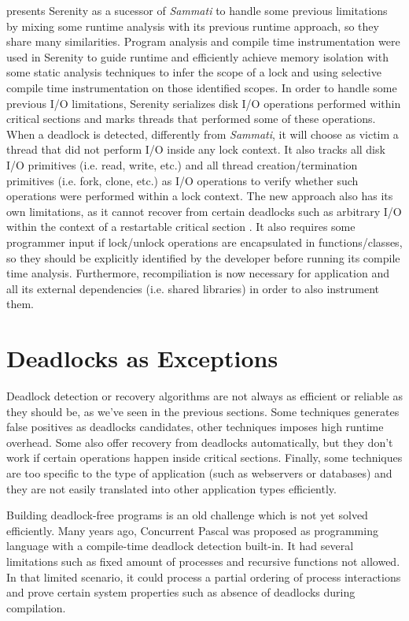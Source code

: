 \citet{serenity} presents Serenity as a sucessor of \emph{Sammati} \citep{sammati} to handle some previous limitations by mixing some runtime analysis with
its previous runtime approach, so they share many similarities.
Program analysis and compile time instrumentation were used in Serenity to guide runtime and efficiently achieve memory isolation with
some static analysis techniques to infer the scope of a lock and using selective compile time instrumentation on those identified scopes.
In order to handle some previous I/O limitations, Serenity serializes disk I/O operations performed within critical sections and marks
threads that performed some of these operations.
When a deadlock is detected, differently from \emph{Sammati}, it will choose as victim a thread that did not perform I/O inside any lock context.
It also tracks all disk I/O primitives (i.e. read, write, etc.) and all thread creation/termination primitives (i.e. fork, clone,
etc.) as I/O operations to verify whether such operations were performed within a lock context.
The new approach also has its own limitations, as it cannot recover from certain deadlocks such as arbitrary I/O within the context of a restartable critical section \citep{pyla}.
It also requires some programmer input if lock/unlock operations are encapsulated in functions/classes,
so they should be explicitly identified by the developer before running its compile time analysis.
Furthermore, recompiliation is now necessary for application and all its external dependencies (i.e. shared libraries) in order to also instrument them.

\section{Deadlocks as Exceptions}

Deadlock detection or recovery algorithms are not always as efficient or reliable as they should be, as we've seen in the previous sections.
Some techniques generates false positives as deadlocks candidates, other techniques imposes high runtime overhead. Some also offer recovery from
deadlocks automatically, but they don't work if certain operations happen inside critical sections. Finally, some techniques are too specific
to the type of application (such as webservers or databases) and they are not easily translated into other application types efficiently.

Building deadlock-free programs is an old challenge which is not yet solved efficiently.
Many years ago, Concurrent Pascal \citep{hansen} was proposed as programming language with a compile-time deadlock detection built-in.
It had several limitations such as fixed amount of processes and recursive functions not allowed.
In that limited scenario, it could process a partial ordering of process interactions and prove certain system properties such as absence of deadlocks during compilation.

